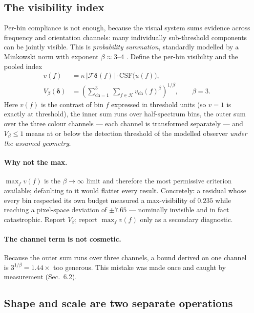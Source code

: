 \documentclass[11pt,a4paper]{article}
\begin{document}
\subsection{The visibility index}
\label{sec:visibility}

Per-bin compliance is not enough, because the visual system sums evidence
across frequency and orientation channels: many individually sub-threshold
components can be jointly visible. This is \emph{probability summation},
standardly modelled by a Minkowski norm with exponent $\beta\approx3$--$4$
\citep{quick1974,robson1981,watson1979}. Define the per-bin visibility and
the pooled index
\begin{align}
  v(f) &= \kappa\,\big|\mathcal{F}\boldsymbol{\delta}(f)\big|\cdot
          \mathrm{CSF}\big(u(f)\big), \label{eq:vbin}\\
  V_\beta(\boldsymbol{\delta}) &=
     \left(\sum_{\mathrm{ch}=1}^{3}\ \sum_{f\in\mathcal{K}}
       v_{\mathrm{ch}}(f)^{\beta}\right)^{1/\beta},
     \qquad \beta = 3 .
  \label{eq:visibility}
\end{align}
Here $v(f)$ is the contrast of bin $f$ expressed in threshold units (so
$v=1$ is exactly at threshold), the inner sum runs over half-spectrum bins,
the outer sum over the three colour channels --- each channel is transformed
separately --- and $V_\beta\le1$ means at or below the detection threshold
of the modelled observer \emph{under the assumed geometry}.

\paragraph{Why not the max.}
$\max_f v(f)$ is the $\beta\to\infty$ limit and therefore the most
permissive criterion available; defaulting to it would flatter every result.
Concretely: a residual whose every bin respected its own budget measured a
max-visibility of $0.235$ while reaching a pixel-space deviation of
$\pm7.65$ --- nominally invisible and in fact catastrophic. Report
$V_\beta$; report $\max_f v(f)$ only as a secondary diagnostic.

\paragraph{The channel term is not cosmetic.}
Because the outer sum runs over three channels, a bound derived on one
channel is $3^{1/\beta}=1.44\times$ too generous. This mistake was made once
and caught by measurement (Sec.~6.2).

\subsection{Shape and scale are two separate operations}
\end{document}
